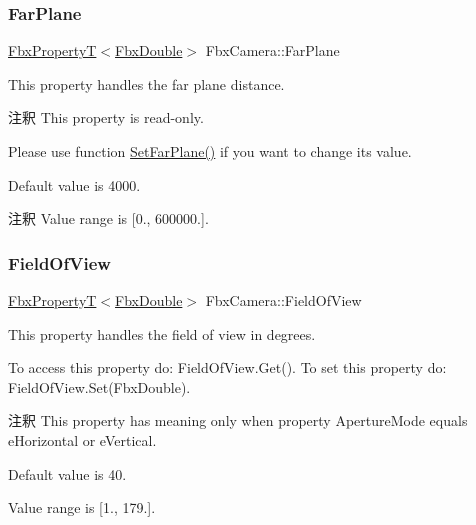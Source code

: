 \subsubsection{\texorpdfstring{Far\+Plane}{FarPlane}}
{\footnotesize\ttfamily \hyperlink{class_fbx_property_t}{Fbx\+PropertyT}$<$\hyperlink{fbxtypes_8h_a171e72a1c46fc15c1a6c9c31948c1c5b}{Fbx\+Double}$>$ Fbx\+Camera\+::\+Far\+Plane}

This property handles the far plane distance.

\begin{DoxyRemark}{注釈}
This property is read-\/only. 

Please use function \hyperlink{class_fbx_camera_a23f2f8bba739049a5e0ea55213085787}{Set\+Far\+Plane()} if you want to change its value.
\end{DoxyRemark}
Default value is 4000. \begin{DoxyRemark}{注釈}
Value range is \mbox{[}0., 600000.\mbox{]}. 
\end{DoxyRemark}
\mbox{\label{class_fbx_camera_acec3ce4b786d019a16a2de9f23ff42d8}} 
\subsubsection{\texorpdfstring{Field\+Of\+View}{FieldOfView}}
{\footnotesize\ttfamily \hyperlink{class_fbx_property_t}{Fbx\+PropertyT}$<$\hyperlink{fbxtypes_8h_a171e72a1c46fc15c1a6c9c31948c1c5b}{Fbx\+Double}$>$ Fbx\+Camera\+::\+Field\+Of\+View}

This property handles the field of view in degrees.

To access this property do\+: Field\+Of\+View.\+Get(). To set this property do\+: Field\+Of\+View.\+Set(\+Fbx\+Double).

\begin{DoxyRemark}{注釈}
This property has meaning only when property Aperture\+Mode equals e\+Horizontal or e\+Vertical.

Default value is 40. 

Value range is \mbox{[}1., 179.\mbox{]}. 
\end{DoxyRemark}
\mbox{\label{class_fbx_camera_a2e0c65d8225c5f73c6cf9a927a0523fb}} 
